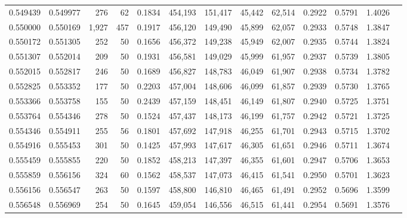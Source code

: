 \begin{tabular}{rrrrrrrrrrrrr}
0.549439 & 0.549977 &   276 &  62 &                                     0.1834 & 454,193 & 151,417 &  45,442 &  62,514 & 0.2922 & 0.5791 & 1.4026 \\
0.550000 & 0.550169 & 1,927 & 457 &                                     0.1917 & 456,120 & 149,490 &  45,899 &  62,057 & 0.2933 & 0.5748 & 1.3847 \\
0.550172 & 0.551305 &   252 &  50 &                                     0.1656 & 456,372 & 149,238 &  45,949 &  62,007 & 0.2935 & 0.5744 & 1.3824 \\
0.551307 & 0.552014 &   209 &  50 &                                     0.1931 & 456,581 & 149,029 &  45,999 &  61,957 & 0.2937 & 0.5739 & 1.3805 \\
0.552015 & 0.552817 &   246 &  50 &                                     0.1689 & 456,827 & 148,783 &  46,049 &  61,907 & 0.2938 & 0.5734 & 1.3782 \\
0.552825 & 0.553352 &   177 &  50 &                                     0.2203 & 457,004 & 148,606 &  46,099 &  61,857 & 0.2939 & 0.5730 & 1.3765 \\
0.553366 & 0.553758 &   155 &  50 &                                     0.2439 & 457,159 & 148,451 &  46,149 &  61,807 & 0.2940 & 0.5725 & 1.3751 \\
0.553764 & 0.554346 &   278 &  50 &                                     0.1524 & 457,437 & 148,173 &  46,199 &  61,757 & 0.2942 & 0.5721 & 1.3725 \\
0.554346 & 0.554911 &   255 &  56 &                                     0.1801 & 457,692 & 147,918 &  46,255 &  61,701 & 0.2943 & 0.5715 & 1.3702 \\
0.554916 & 0.555453 &   301 &  50 &                                     0.1425 & 457,993 & 147,617 &  46,305 &  61,651 & 0.2946 & 0.5711 & 1.3674 \\
0.555459 & 0.555855 &   220 &  50 &                                     0.1852 & 458,213 & 147,397 &  46,355 &  61,601 & 0.2947 & 0.5706 & 1.3653 \\
0.555859 & 0.556156 &   324 &  60 &                                     0.1562 & 458,537 & 147,073 &  46,415 &  61,541 & 0.2950 & 0.5701 & 1.3623 \\
0.556156 & 0.556547 &   263 &  50 &                                     0.1597 & 458,800 & 146,810 &  46,465 &  61,491 & 0.2952 & 0.5696 & 1.3599 \\
0.556548 & 0.556969 &   254 &  50 &                                     0.1645 & 459,054 & 146,556 &  46,515 &  61,441 & 0.2954 & 0.5691 & 1.3576 \\

\end{tabular}
